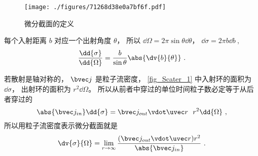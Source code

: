 
\begin{issues}
\issueDraft
\end{issues}



\begin{figure}[ht]
\centering
\texttt{[image: ./figures/71268d38e0a7bf6f.pdf]}
\caption{微分截面的定义} \label{fig_Scater_1}
\end{figure}

每个入射距离 $b$ 对应一个出射角度 $\theta$， 所以 $\dd\Omega = 2\pi \sin\theta \dd{\theta}$， $\dd{\sigma} = 2\pi b \dd{b}~,$
\begin{equation}
\frac{\dd{\sigma}}{\dd{\Omega}} = \frac{b}{\sin\theta} \abs{\dv{b}{\theta}}~.
\end{equation}

若散射是轴对称的， $\bvec j$ 是粒子流密度， \autoref{fig_Scater_1} 中入射环的面积为 $\dd{\sigma}$， 出射环的面积为 $r^2\dd{\Omega}$。 所以从前者中穿过的单位时间粒子数必定等于从后者穿过的
\begin{equation}
\abs{\bvec j_{in}}\dd{\sigma} = \bvec j_{out} \vdot \uvec r\ \ r^2\dd{\Omega}~,
\end{equation}
所以用粒子流密度表示微分截面就是
\begin{equation}
\dv{\sigma}{\Omega} = \lim_{r\to\infty} \frac{(\bvec j_{out} \vdot \uvec r) r^2}{\abs{\bvec j_{in}}}~.
\end{equation}
